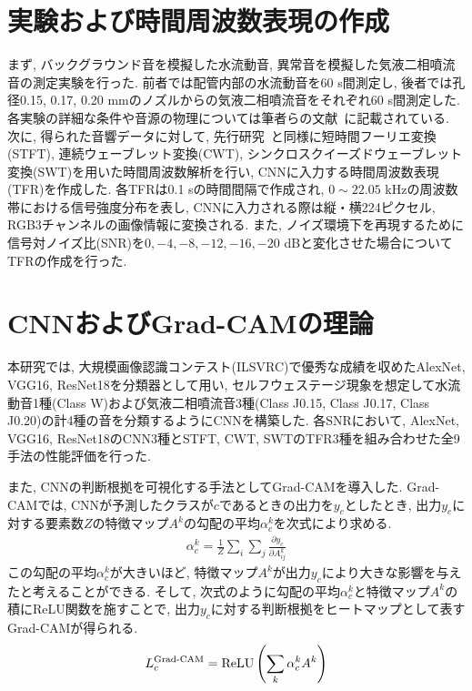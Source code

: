 \documentclass[10pt, fleqn, twocolumn]{jsarticle}
\begin{document}
\section{実験および時間周波数表現の作成}
まず, バックグラウンド音を模擬した水流動音, 異常音を模擬した気液二相噴流音の測定実験を行った.
前者では配管内部の水流動音を60 s間測定し, 後者では孔径0.15, 0.17, 0.20 mmのノズルからの気液二相噴流音をそれぞれ60 s間測定した.
各実験の詳細な条件や音源の物理については筆者らの文献~\cite{Mikami2023a,Mikami2023b}に記載されている.
次に, 得られた音響データに対して, 先行研究~\cite{Zhang2021}と同様に短時間フーリエ変換(STFT), 連続ウェーブレット変換(CWT), シンクロスクイーズドウェーブレット変換(SWT)を用いた時間周波数解析を行い, CNNに入力する時間周波数表現(TFR)を作成した.
各TFRは0.1 sの時間間隔で作成され, $0\sim22.05$ kHzの周波数帯における信号強度分布を表し, CNNに入力される際は縦・横224ピクセル, RGB3チャンネルの画像情報に変換される.
また, ノイズ環境下を再現するために信号対ノイズ比(SNR)を$0, -4, -8, -12, -16, -20$ dBと変化させた場合についてTFRの作成を行った.



\section{CNNおよびGrad-CAMの理論}
本研究では, 大規模画像認識コンテスト(ILSVRC)で優秀な成績を収めたAlexNet, VGG16, ResNet18を分類器として用い, セルフウェステージ現象を想定して水流動音1種(Class W)および気液二相噴流音3種(Class J0.15, Class J0.17, Class J0.20)の計4種の音を分類するようにCNNを構築した.
各SNRにおいて, AlexNet, VGG16, ResNet18のCNN3種とSTFT, CWT, SWTのTFR3種を組み合わせた全9手法の性能評価を行った.

また, CNNの判断根拠を可視化する手法としてGrad-CAMを導入した.
Grad-CAMでは, CNNが予測したクラスが$c$であるときの出力を$y_c$としたとき, 出力$y_c$に対する要素数$Z$の特徴マップ$A^k$の勾配の平均$\alpha_c^k$を次式により求める.
\begin{align}
  \label{eq:neuron_importance_weight}
  \alpha_c^k=\frac{1}{Z}\sum_i\sum_j\frac{\partial{y_c}}{\partial{A_{ij}^k}}
\end{align}
この勾配の平均$\alpha_c^k$が大きいほど, 特徴マップ$A^k$が出力$y_c$により大きな影響を与えたと考えることができる.
そして, 次式のように勾配の平均$\alpha_c^k$と特徴マップ$A^k$の積にReLU関数を施すことで, 出力$y_c$に対する判断根拠をヒートマップとして表すGrad-CAMが得られる.
\begin{align}
  \label{eq:grad-cam}
  L_c^{\textrm{Grad-CAM}}={\rm ReLU}\left(\sum_k\alpha_c^kA^k\right)
\end{align}
\end{document}
